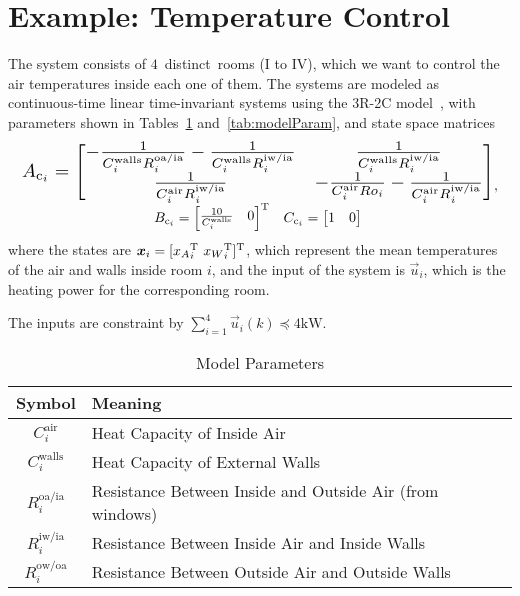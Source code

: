 \documentclass{ifacconf}  %
\begin{document}
\section{Example: Temperature Control}\label{sec:App_dMPC}
The system consists of $4$~distinct~rooms (I to IV), which we want to control the air temperatures inside each one of them.
The systems are modeled as continuous-time linear \mbox{time-invariant} systems using the \mbox{3R-2C} model~\citep{NogueiraEtAl2021}, with parameters shown in Tables~\ref{tab:modelParamMeaning} and~\ref{tab:modelParam}, and state space matrices
\begin{equation*}
  \label{eq:room_system}
  \begin{matrix}
\resizebox{.98\columnwidth}{!}{$
  A_{\mathrm{c}_{i}}=\left[
    \begin{matrix}
      -\frac{1}{C^{\text{walls}}_{i}R^{\text{oa/ia}}_{i}}-\frac{1}{C^{\text{walls}}_{i}R^{\text{iw/ia}}_{i}}& \frac{1}{C^{\text{walls}}_{i}R^{\text{iw/ia}}_{i}}\\
      \frac{1}{C^{\text{air}}_{i}R^{\text{iw/ia}}_{i}} &-\frac{1}{C^{\text{air}}_{i}Ro_{i}}-\frac{1}{C^{\text{air}}_{i}R^{\text{iw/ia}}_{i}}
    \end{matrix}\right]
    $}
  \\
  \begin{matrix}
    B_{\mathrm{c}_{i}}=\left[
      \begin{matrix}  \frac{10}{C^{\text{walls}}_{i}}& 0\end{matrix}
    \right]\T&C_{\mathrm{c}_{i}}=\left[\begin{matrix}1 & 0\end{matrix}\right]
  \end{matrix}
  \end{matrix},
\end{equation*}
where the states are ${\vec{x}_{i}=[{{x}_{A}}_{i}\T\ {{x}_{W}}_{i}\T]\T}$, which represent the mean temperatures of the air and walls inside room $i$, and the input of the system is $\vec{u}_{i}$, which is the heating power
for the corresponding room.

The inputs are constraint by ${\sum_{i=1}^{4}\vec{u}_{i}(k)\preceq 4\mathrm{kW}}$.


\begin{table}[b]
  \centering
  \caption{Model Parameters}\label{tab:modelParamMeaning}
  \begin{tabular}[b]{cl}
    \toprule
    Symbol&Meaning\\
    \midrule
    $C^{\text{air}}_{i}$&Heat Capacity of Inside Air\\
    $C^{\text{walls}}_{i}$&Heat Capacity of External Walls\\
    $R^{\text{oa/ia}}_{i}$&Resistance Between Inside and Outside Air (from windows)\\
    $R^{\text{iw/ia}}_{i}$&Resistance Between Inside Air and Inside Walls\\
    $R^{\text{ow/oa}}_{i}$&Resistance Between Outside Air and Outside Walls\\
    \bottomrule
  \end{tabular}
\end{table}
\end{document}
